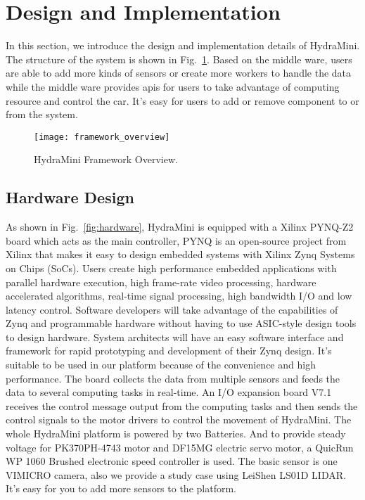 \section{Design and Implementation}
In this section, we introduce the design and implementation details of HydraMini. The structure of the system is shown in Fig.~\ref{fig:framework_overview}. Based on the middle ware, users are able to add more kinds of sensors or create more workers to handle the data while the middle ware provides apis for users to take advantage of computing resource and control the car. It's easy for users to add or remove component to or from the system. 

\begin{figure}[t]
    \centering
    \texttt{[image: framework\_overview]}
    \caption{HydraMini Framework Overview.}
    \label{fig:framework_overview}
\end{figure}

\subsection{Hardware Design}
As shown in Fig.~\ref{fig:hardware}, HydraMini is equipped with a Xilinx PYNQ-Z2 board which acts as the main controller, PYNQ\cite{tul2019tulpynqz2} is an open-source project from Xilinx that makes it easy to design embedded systems with Xilinx Zynq Systems on Chips (SoCs). Users create high performance embedded applications with parallel hardware execution, high frame-rate video processing, hardware accelerated algorithms, real-time signal processing, high bandwidth I/O and low latency control. Software developers will take advantage of the capabilities of Zynq and programmable hardware without having to use ASIC-style design tools to design hardware. System architects will have an easy software interface and framework for rapid prototyping and development of their Zynq design. It's suitable to be used in our platform because of the convenience and high performance. The board collects the data from multiple sensors and feeds the data to several computing tasks in real-time. An I/O expansion board V7.1 receives the control message output from the computing tasks and then sends the control signals to the motor drivers to control the movement of HydraMini. The whole HydraMini platform is powered by two Batteries. And to provide steady voltage for PK370PH-4743 motor and DF15MG electric servo motor, a QuicRun WP 1060 Brushed electronic speed controller is used. The basic sensor is one VIMICRO camera, also we provide a study case using LeiShen LS01D LIDAR. It's easy for you to add more sensors to the platform.


